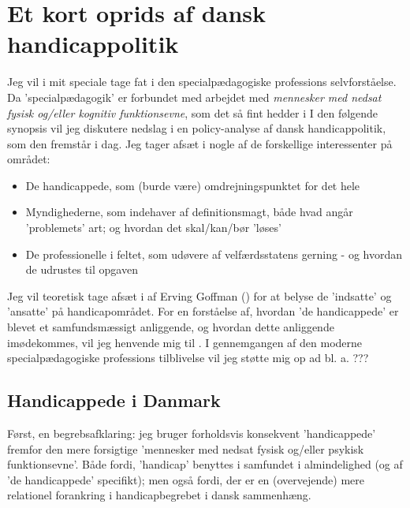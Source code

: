 \section{Et kort oprids af dansk handicappolitik}

Jeg vil i mit speciale tage fat i den specialpædagogiske professions selvforståelse.
Da 'specialpædagogik' er forbundet med arbejdet med \textit{mennesker med nedsat fysisk og/eller kognitiv funktionsevne}, som det så fint hedder i 
I den følgende synopsis vil jeg diskutere nedslag i en policy-analyse af dansk handicappolitik, som den fremstår i dag.
Jeg tager afsæt i nogle af de forskellige interessenter på området:
\begin{itemize}
  \item
    De handicappede, som (burde være) omdrejningspunktet for det hele
  \item
    Myndighederne, som indehaver af definitionsmagt, både hvad angår 'problemets' art; og hvordan det skal/kan/bør 'løses'
  \item
    De professionelle i feltet, som udøvere af velfærdsstatens gerning - og hvordan de udrustes til opgaven
\end{itemize}

Jeg vil teoretisk tage afsæt i  af Erving Goffman (\citeyear{goffmanAsylumsEssaysSocial1991}) for at belyse de 'indsatte' og 'ansatte' på handicapområdet.
For en forståelse af, hvordan 'de handicappede' er blevet et samfundsmæssigt anliggende, og hvordan dette anliggende imødekommes, vil jeg henvende mig til \citeauthor{scheurichPolicyArchaeologyNew1994}.
I gennemgangen af den moderne specialpædagogiske professions tilblivelse vil jeg støtte mig op ad bl. a. ??? 

\subsection{Handicappede i Danmark}
Først, en begrebsafklaring: jeg bruger forholdsvis konsekvent 'handicappede' fremfor den mere forsigtige 'mennesker med nedsat fysisk og/eller psykisk funktionsevne'.
Både fordi, 'handicap' benyttes i samfundet i almindelighed (og af 'de handicappede' specifikt); men også fordi, der er en (overvejende) mere relationel forankring i handicapbegrebet i dansk sammenhæng.  

